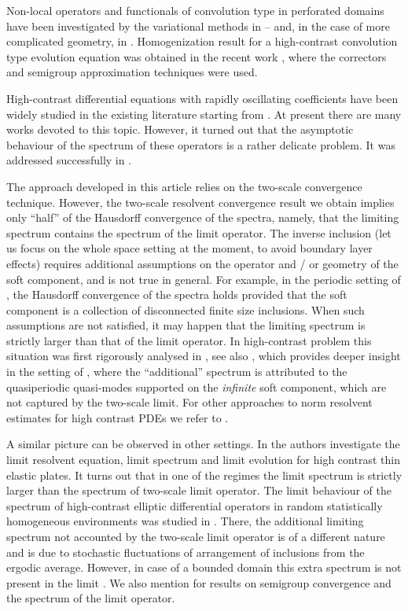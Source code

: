 \documentclass[11pt]{article}
\theoremstyle{remark}
\begin{document}
Non-local operators and functionals of convolution type in perforated domains have been investigated by the variational methods in \cite{BrP2021}--\cite{BrP2022} and, in the case of more complicated geometry, in \cite{BCE2021}.
Homogenization result for a high-contrast convolution type evolution equation was obtained in the recent
work \cite{PiZhiz_arxiv},  where  the correctors and semigroup approximation techniques were used.

High-contrast differential equations with rapidly oscillating coefficients have been widely studied in the
existing literature starting from   \cite{ADH1990}. At present there are many works devoted to this topic. %
However, it turned out that %
the asymptotic behaviour of the spectrum
of these operators is a rather delicate problem. It was addressed successfully in \cite{Zhikov2000}. %

The approach developed in this article relies on the two-scale convergence technique.
However, the two-scale resolvent convergence result we obtain implies only ``half'' of the Hausdorff convergence of the spectra, namely, that the limiting spectrum contains the    spectrum of the limit operator. The inverse inclusion (let us focus on the whole space setting at the moment, to avoid boundary layer effects) requires additional assumptions on the operator and / or geometry of the soft component, and is not true in general. For example, in the periodic setting of \cite{Zhikov2000},\cite{Zhikov2004} the Hausdorff convergence of the spectra holds provided that the soft component is a collection of disconnected finite size inclusions. When such assumptions are not satisfied, it may happen that the limiting spectrum is strictly larger than that of the limit operator. In high-contrast problem this situation was first rigorously analysed in \cite{Coo2018}, see also \cite{CKS2023}, which provides deeper insight in the setting of \cite{Coo2018}, where the ``additional'' spectrum is attributed to the quasiperiodic quasi-modes supported on the {\it infinite} soft component, which are not captured by the two-scale limit. For other approaches to norm resolvent estimates for high contrast PDEs we refer to \cite{CC,CKVZ,gloria1}.

A similar picture can be observed in other settings.  In \cite{BCVZ2022} the authors investigate the limit resolvent equation, limit spectrum and limit evolution for high contrast thin elastic plates. It turns out that in one of the regimes the limit spectrum is strictly larger than the spectrum of two-scale limit operator. The limit behaviour of the  spectrum of high-contrast elliptic differential operators in random statistically
homogeneous environments was studied in  \cite{CCV23}. There, the additional limiting spectrum not accounted by the two-scale limit operator is of a different nature and is due to stochastic fluctuations of arrangement of inclusions from the ergodic average. However, in case of a bounded domain this extra spectrum is not present in the limit \cite{CCV2019}. We also mention \cite{APZ} for results on semigroup convergence and the spectrum of the limit operator.
\end{document}
